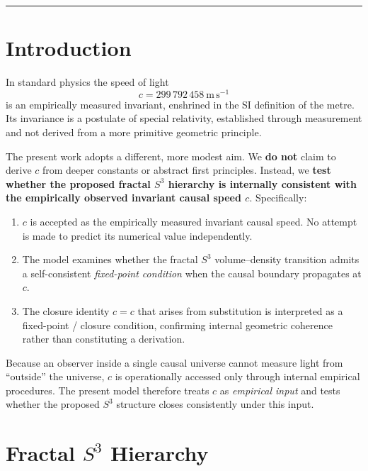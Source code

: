\documentclass[11pt,a4paper]{article}
\begin{document}
\vspace{10pt}
{\color{ruleblue}\hrule}
\vspace{14pt}

\section{Introduction}

In standard physics the speed of light
\[
  c = 299\,792\,458\ \mathrm{m\,s^{-1}}
\]
is an empirically measured invariant, enshrined in the SI definition of the metre.
Its invariance is a postulate of special relativity, established through measurement
and not derived from a more primitive geometric principle.

The present work adopts a different, more modest aim. We \textbf{do not} claim to
derive $c$ from deeper constants or abstract first principles. Instead, we
\textbf{test whether the proposed fractal $S^3$ hierarchy is internally consistent
with the empirically observed invariant causal speed $c$}. Specifically:
\begin{enumerate}[leftmargin=2em, itemsep=3pt]
  \item $c$ is accepted as the empirically measured invariant causal speed. No
    attempt is made to predict its numerical value independently.
  \item The model examines whether the fractal $S^3$ volume--density transition
    admits a self-consistent \emph{fixed-point condition} when the causal boundary
    propagates at $c$.
  \item The closure identity $c = c$ that arises from substitution is interpreted
    as a fixed-point / closure condition, confirming internal geometric coherence
    rather than constituting a derivation.
\end{enumerate}

Because an observer inside a single causal universe cannot measure light from
``outside'' the universe, $c$ is operationally accessed only through internal
empirical procedures. The present model therefore treats $c$ as \emph{empirical
input} and tests whether the proposed $S^3$ structure closes consistently under
this input.

\section{Fractal $S^3$ Hierarchy}
\end{document}
